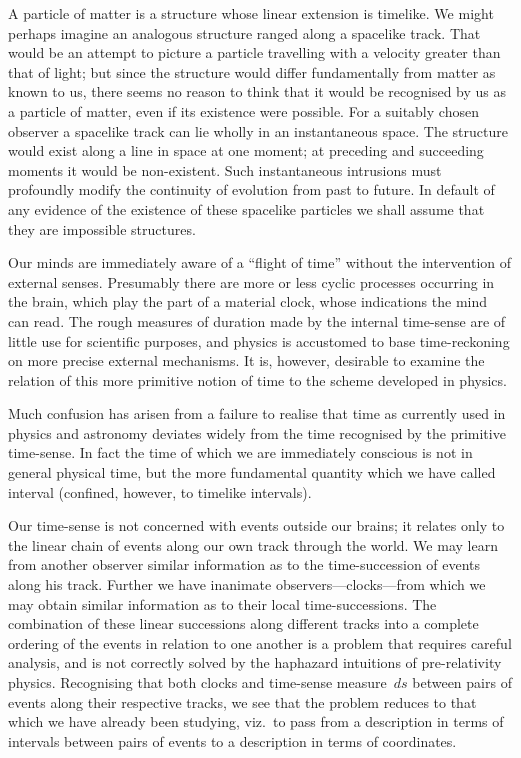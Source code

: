 \documentclass[12pt]{book}
\begin{document}
A particle of matter is a structure whose linear extension is timelike. We
might perhaps imagine an analogous structure ranged along a spacelike track.
That would be an attempt to picture a particle travelling with a velocity
greater than that of light; but since the structure would differ fundamentally
from matter as known to us, there seems no reason to think that it would be
recognised by us as a particle of matter, even if its existence were possible.
For a suitably chosen observer a spacelike track can lie wholly in an instantaneous
space. The structure would exist along a line in space at one moment;
at preceding and succeeding moments it would be non\hyp{}existent. Such instantaneous
intrusions must profoundly modify the continuity of evolution from
past to future. In default of any evidence of the existence of these spacelike
particles we shall assume that they are impossible structures.

%

Our minds are immediately aware of a ``flight of time'' without the intervention
of external senses. Presumably there are more or less cyclic processes
occurring in the brain, which play the part of a material clock, whose indications
the mind can read. The rough measures of duration made by the internal
time-sense are of little use for scientific purposes, and physics is accustomed
to base time\hyp{}reckoning on more precise external mechanisms. It is, however,
desirable to examine the relation of this more primitive notion of time to the
scheme developed in physics.

Much confusion has arisen from a failure to realise that time as currently
used in physics and astronomy deviates widely from the time recognised by
the primitive time-sense. In fact the time of which we are immediately conscious
is not in general physical time, but the more fundamental quantity
which we have called interval (confined, however, to timelike intervals).

Our time-sense is not concerned with events outside our brains; it relates
only to the linear chain of events along our own track through the world. We
may learn from another observer similar information as to the time\hyp{}succession
of events along his track. Further we have inanimate observers---clocks---from
which we may obtain similar information as to their local time\hyp{}successions.
The combination of these linear successions along different tracks into a complete
ordering of the events in relation to one another is a problem that
requires careful analysis, and is not correctly solved by the haphazard intuitions
of pre\hyp{}relativity physics. Recognising that both clocks and time-sense measure~$ds$
between pairs of events along their respective tracks, we see that the
problem reduces to that which we have already been studying, viz.\ to pass
from a description in terms of intervals between pairs of events to a description
in terms of coordinates.
\end{document}
